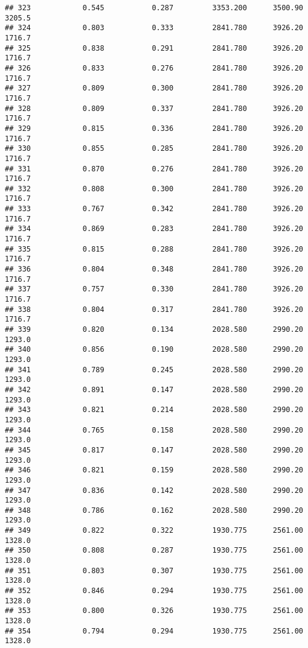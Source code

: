 \documentclass[
]{article}
\begin{document}
\begin{verbatim}
## 323            0.545           0.287         3353.200      3500.90       3205.5
## 324            0.803           0.333         2841.780      3926.20       1716.7
## 325            0.838           0.291         2841.780      3926.20       1716.7
## 326            0.833           0.276         2841.780      3926.20       1716.7
## 327            0.809           0.300         2841.780      3926.20       1716.7
## 328            0.809           0.337         2841.780      3926.20       1716.7
## 329            0.815           0.336         2841.780      3926.20       1716.7
## 330            0.855           0.285         2841.780      3926.20       1716.7
## 331            0.870           0.276         2841.780      3926.20       1716.7
## 332            0.808           0.300         2841.780      3926.20       1716.7
## 333            0.767           0.342         2841.780      3926.20       1716.7
## 334            0.869           0.283         2841.780      3926.20       1716.7
## 335            0.815           0.288         2841.780      3926.20       1716.7
## 336            0.804           0.348         2841.780      3926.20       1716.7
## 337            0.757           0.330         2841.780      3926.20       1716.7
## 338            0.804           0.317         2841.780      3926.20       1716.7
## 339            0.820           0.134         2028.580      2990.20       1293.0
## 340            0.856           0.190         2028.580      2990.20       1293.0
## 341            0.789           0.245         2028.580      2990.20       1293.0
## 342            0.891           0.147         2028.580      2990.20       1293.0
## 343            0.821           0.214         2028.580      2990.20       1293.0
## 344            0.765           0.158         2028.580      2990.20       1293.0
## 345            0.817           0.147         2028.580      2990.20       1293.0
## 346            0.821           0.159         2028.580      2990.20       1293.0
## 347            0.836           0.142         2028.580      2990.20       1293.0
## 348            0.786           0.162         2028.580      2990.20       1293.0
## 349            0.822           0.322         1930.775      2561.00       1328.0
## 350            0.808           0.287         1930.775      2561.00       1328.0
## 351            0.803           0.307         1930.775      2561.00       1328.0
## 352            0.846           0.294         1930.775      2561.00       1328.0
## 353            0.800           0.326         1930.775      2561.00       1328.0
## 354            0.794           0.294         1930.775      2561.00       1328.0

\end{verbatim}
\end{document}
